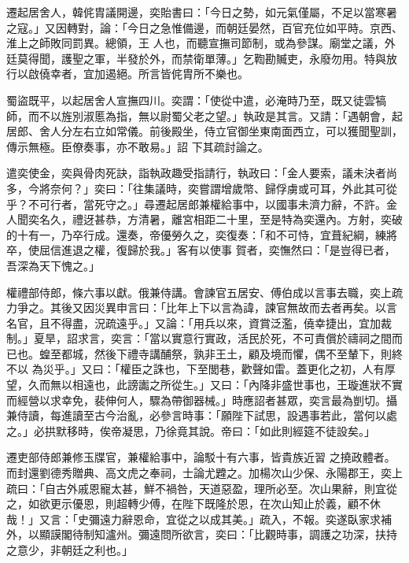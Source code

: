 \begin{pinyinscope}
 遷起居舍人，韓侂胄議開邊，奕貽書曰：「今日之勢，如元氣僅屬，不足以當寒暑之寇。」又因轉對，論：「今日之急惟備邊，而朝廷晏然，百官充位如平時。京西、淮上之師敗同罰異。總領，王
 人也，而聽宣撫司節制，或為參謀。廟堂之議，外廷莫得聞，護聖之軍，半發於外，而禁衛單薄。」乞鞫勘贓吏，永廢勿用。特與放行以啟僥幸者，宜加遏絕。所言皆侂胄所不樂也。



 蜀盜既平，以起居舍人宣撫四川。奕謂：「使從中遣，必淹時乃至，既又徒雲犒師，而不以旌別淑慝為指，無以尉蜀父老之望。」執政是其言。又請：「遇朝會，起居郎、舍人分左右立如常儀。前後殿坐，侍立官御坐東南面西立，可以獲聞聖訓，傳示無極。臣僚奏事，亦不敢易。」詔
 下其疏討論之。



 遣奕使金，奕與骨肉死訣，詣執政趣受指請行，執政曰：「金人要索，議未決者尚多，今將奈何？」奕曰：「往集議時，奕嘗謂增歲幣、歸俘虜或可耳，外此其可從乎？不可行者，當死守之。」尋遷起居郎兼權給事中，以國事未濟力辭，不許。金人聞奕名久，禮迓甚恭，方清暑，離宮相距二十里，至是特為奕還內。方射，奕破的十有一，乃卒行成。還奏，帝優勞久之，奕復奏：「和不可恃，宜葺紀綱，練將卒，使屈信進退之權，復歸於我。」客有以使事
 賀者，奕憮然曰：「是豈得已者，吾深為天下愧之。」



 權禮部侍郎，條六事以獻。俄兼侍講。會諫官五居安、傅伯成以言事去職，奕上疏力爭之。其後又因災異申言曰：「比年上下以言為諱，諫官無故而去者再矣。以言名官，且不得盡，況疏遠乎。」又論：「用兵以來，資賞泛濫，僥幸捷出，宜加裁制。」夏旱，詔求言，奕言：「當以實意行實政，活民於死，不可責償於禱祠之間而已也。蝗至都城，然後下禮寺講酺祭，孰非王土，顧及境而懼，偶不至輦下，則終不以
 為災乎。」又曰：「權臣之誅也，下至閭巷，歡聲如雷。蓋更化之初，人有厚望，久而無以相遠也，此謗讟之所從生。」又曰：「內降非盛世事也，王璇進狀不實而經營以求幸免，裴伸何人，驟為帶御器械。」時應詔者甚眾，奕言最為剴切。攝兼侍讀，每進讀至古今治亂，必參言時事：「願陛下試思，設遇事若此，當何以處之。」必拱默移時，俟帝凝思，乃徐竟其說。帝曰：「如此則經筵不徒設矣。」



 遷吏部侍郎兼修玉牒官，兼權給事中，論駁十有六事，皆貴族近習
 之撓政體者。而封還劉德秀贈典、高文虎之奉祠，士論尤韙之。加楊次山少保、永陽郡王，奕上疏曰：「自古外戚恩寵太甚，鮮不禍咎，天道惡盈，理所必至。次山果辭，則宜從之，如欲更示優恩，則超轉少傅，在陛下既隆於恩，在次山知止於義，顧不休哉！」又言：「史彌遠力辭恩命，宜從之以成其美。」疏入，不報。奕遂臥家求補外，以顯謨閣待制知瀘州。彌遠問所欲言，奕曰：「比觀時事，調護之功深，扶持之意少，非朝廷之利也。」




\end{pinyinscope}
